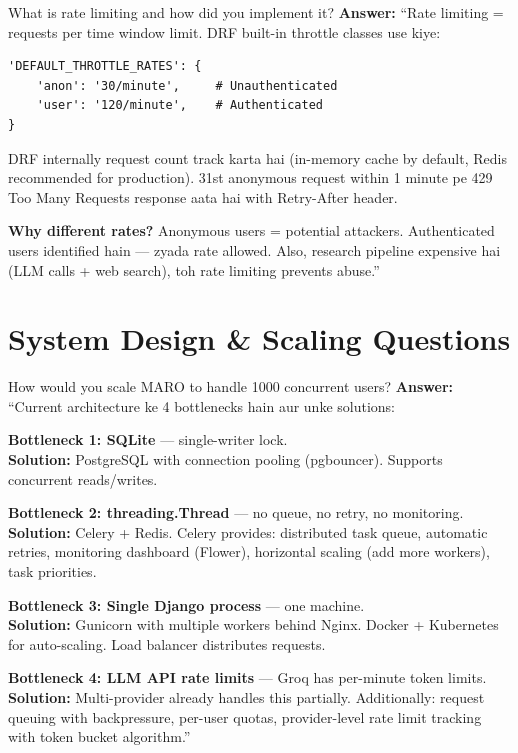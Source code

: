 \documentclass[11pt,a4paper,twoside]{report}
\begin{document}
\begin{interviewbox}{What is rate limiting and how did you implement it?}
\textbf{Answer:} ``Rate limiting = requests per time window limit. DRF built-in throttle classes use kiye:
\begin{lstlisting}[style=pythonstyle]
'DEFAULT_THROTTLE_RATES': {
    'anon': '30/minute',     # Unauthenticated
    'user': '120/minute',    # Authenticated
}
\end{lstlisting}

DRF internally request count track karta hai (in-memory cache by default, Redis recommended for production). 31st anonymous request within 1 minute pe 429 Too Many Requests response aata hai with Retry-After header.

\textbf{Why different rates?} Anonymous users = potential attackers. Authenticated users identified hain --- zyada rate allowed. Also, research pipeline expensive hai (LLM calls + web search), toh rate limiting prevents abuse.''
\end{interviewbox}

\section{System Design \& Scaling Questions}

\begin{interviewbox}{How would you scale MARO to handle 1000 concurrent users?}
\textbf{Answer:} ``Current architecture ke 4 bottlenecks hain aur unke solutions:

\textbf{Bottleneck 1: SQLite} --- single-writer lock. \\
\textbf{Solution:} PostgreSQL with connection pooling (pgbouncer). Supports concurrent reads/writes.

\textbf{Bottleneck 2: threading.Thread} --- no queue, no retry, no monitoring. \\
\textbf{Solution:} Celery + Redis. Celery provides: distributed task queue, automatic retries, monitoring dashboard (Flower), horizontal scaling (add more workers), task priorities.

\textbf{Bottleneck 3: Single Django process} --- one machine. \\
\textbf{Solution:} Gunicorn with multiple workers behind Nginx. Docker + Kubernetes for auto-scaling. Load balancer distributes requests.

\textbf{Bottleneck 4: LLM API rate limits} --- Groq has per-minute token limits. \\
\textbf{Solution:} Multi-provider already handles this partially. Additionally: request queuing with backpressure, per-user quotas, provider-level rate limit tracking with token bucket algorithm.''
\end{interviewbox}
\end{document}
